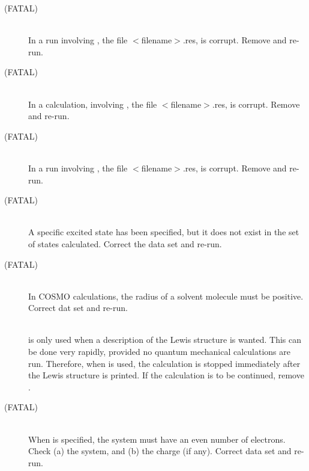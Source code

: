 \begin{description}
\item[ (FATAL)]~\\
In a  run involving , the file $<\!$filename$\!>$.res, 
is corrupt.  Remove   and re-run.          
 
\item[ (FATAL)]~\\
In a  calculation, involving , the file 
$<\!$filename$\!>$.res, is corrupt.  Remove   and re-run.       
 
\item[ (FATAL)]~\\
In a run involving , the file $<\!$filename$\!>$.res, is corrupt.  
Remove   and re-run.       
 
\item[ (FATAL)]~\\
A specific excited state has been specified, but it does not exist in the 
set of states calculated.  Correct the data set and re-run.
 
\item[ (FATAL)]~\\
In COSMO calculations, the radius of a solvent molecule must be positive.
Correct dat set and re-run.
 
\item[]~\\
 is only used when a description of the Lewis structure is wanted.
This can be done very rapidly, provided no quantum mechanical calculations are
run.  Therefore, when  is used, the calculation is stopped immediately
after the Lewis structure is printed.  If the calculation is to be continued,
remove .

\item[ (FATAL)]~\\
When  is specified, the system must have an even number of
electrons.  Check (a) the system, and (b) the charge (if any).  Correct
data set and re-run.
  

\end{description}
